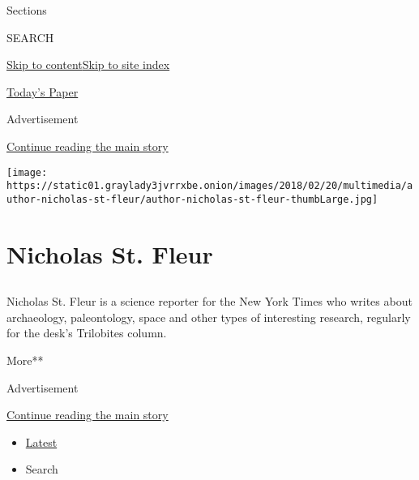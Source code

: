 Sections

SEARCH

\protect\hyperlink{site-content}{Skip to
content}\protect\hyperlink{site-index}{Skip to site index}

\href{https://myaccount.nytimes3xbfgragh.onion/auth/login?response_type=cookie\&client_id=vi}{}

\href{https://www.nytimes3xbfgragh.onion/section/todayspaper}{Today's
Paper}

Advertisement

\protect\hyperlink{after-top}{Continue reading the main story}

\texttt{[image: https://static01.graylady3jvrrxbe.onion/images/2018/02/20/multimedia/author-nicholas-st-fleur/author-nicholas-st-fleur-thumbLarge.jpg]}

\hypertarget{nicholas-st-fleur}{%
\section{Nicholas St. Fleur}\label{nicholas-st-fleur}}

\subsection{}

Nicholas St. Fleur is a science reporter for the New York Times who
writes about archaeology, paleontology, space and other types of
interesting research, regularly for the desk's Trilobites column.

More**

Advertisement

\protect\hyperlink{after-mid1}{Continue reading the main story}

\begin{itemize}
\tightlist
\item
  \protect\hyperlink{stream-panel}{Latest}
\item
  Search
\end{itemize}

